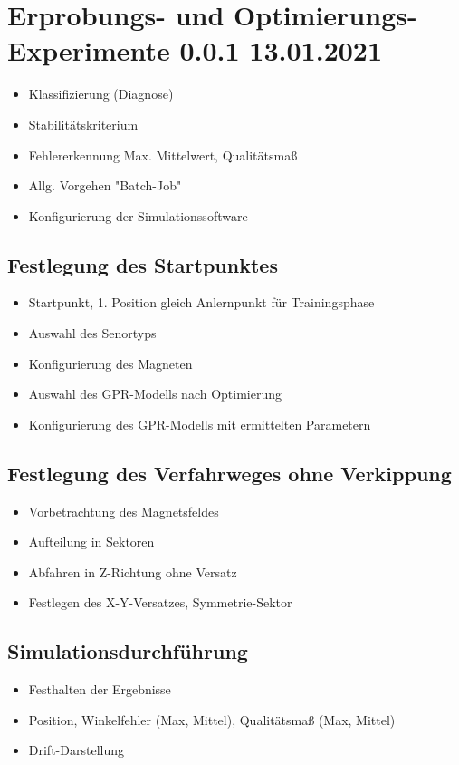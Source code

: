 %

\chapter{Erprobungs- und Optimierungs-Experimente 0.0.1 13.01.2021}
	\begin{itemize}
		\item Klassifizierung (Diagnose)
		\item Stabilitätskriterium
		\item Fehlererkennung Max. Mittelwert, Qualitätsmaß
		\item Allg. Vorgehen "Batch-Job"
		\item Konfigurierung der Simulationssoftware
	\end{itemize}

\section{Festlegung des Startpunktes}
	\begin{itemize}
		\item Startpunkt, 1. Position gleich Anlernpunkt für Trainingsphase
		\item Auswahl des Senortyps
		\item Konfigurierung des Magneten
		\item Auswahl des GPR-Modells nach Optimierung
		\item Konfigurierung des GPR-Modells mit ermittelten Parametern
	\end{itemize}

\section{Festlegung des Verfahrweges ohne Verkippung}
	\begin{itemize}
		\item Vorbetrachtung des Magnetsfeldes 
		\item Aufteilung in Sektoren
		\item Abfahren in Z-Richtung ohne Versatz
		\item Festlegen des X-Y-Versatzes, Symmetrie-Sektor		
	\end{itemize}

\section{Simulationsdurchführung}
	\begin{itemize}
		\item Festhalten der Ergebnisse
		\item Position, Winkelfehler (Max, Mittel), Qualitätsmaß (Max, Mittel)
		\item Drift-Darstellung
	\end{itemize}
	
